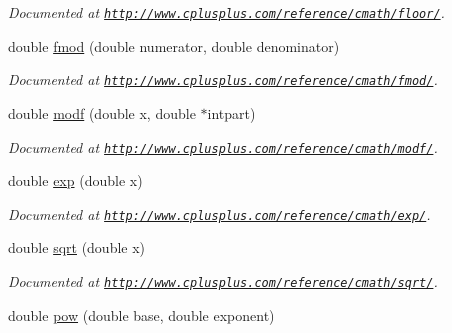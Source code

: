 \begin{DoxyCompactItemize}
\begin{DoxyCompactList}\small\item\em Documented at \href{http://www.cplusplus.com/reference/cmath/floor/}{\tt http\-://www.\-cplusplus.\-com/reference/cmath/floor/}. \end{DoxyCompactList}\item 
\hypertarget{group__math_ga48fbbea0b24950f2622743b9f5fa6bb9}{double \hyperlink{group__math_ga48fbbea0b24950f2622743b9f5fa6bb9}{fmod} (double numerator, double denominator)}\label{group__math_ga48fbbea0b24950f2622743b9f5fa6bb9}

\begin{DoxyCompactList}\small\item\em Documented at \href{http://www.cplusplus.com/reference/cmath/fmod/}{\tt http\-://www.\-cplusplus.\-com/reference/cmath/fmod/}. \end{DoxyCompactList}\item 
\hypertarget{group__math_gaf52b45ed86b2720073966f0d7bb8d36b}{double \hyperlink{group__math_gaf52b45ed86b2720073966f0d7bb8d36b}{modf} (double x, double $\ast$intpart)}\label{group__math_gaf52b45ed86b2720073966f0d7bb8d36b}

\begin{DoxyCompactList}\small\item\em Documented at \href{http://www.cplusplus.com/reference/cmath/modf/}{\tt http\-://www.\-cplusplus.\-com/reference/cmath/modf/}. \end{DoxyCompactList}\item 
\hypertarget{group__math_gae09128febbbe6372cde4fa0c65608a42}{double \hyperlink{group__math_gae09128febbbe6372cde4fa0c65608a42}{exp} (double x)}\label{group__math_gae09128febbbe6372cde4fa0c65608a42}

\begin{DoxyCompactList}\small\item\em Documented at \href{http://www.cplusplus.com/reference/cmath/exp/}{\tt http\-://www.\-cplusplus.\-com/reference/cmath/exp/}. \end{DoxyCompactList}\item 
\hypertarget{group__math_gab87521a75ef827a85807f89a6c10629a}{double \hyperlink{group__math_gab87521a75ef827a85807f89a6c10629a}{sqrt} (double x)}\label{group__math_gab87521a75ef827a85807f89a6c10629a}

\begin{DoxyCompactList}\small\item\em Documented at \href{http://www.cplusplus.com/reference/cmath/sqrt/}{\tt http\-://www.\-cplusplus.\-com/reference/cmath/sqrt/}. \end{DoxyCompactList}\item 
\hypertarget{group__math_ga27382c762927551c5849a43cbd0d0e71}{double \hyperlink{group__math_ga27382c762927551c5849a43cbd0d0e71}{pow} (double base, double exponent)}\label{group__math_ga27382c762927551c5849a43cbd0d0e71}


\end{DoxyCompactItemize}
